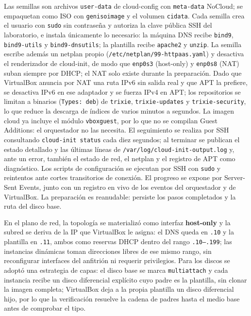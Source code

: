 Las semillas son archivos \texttt{user-data} de cloud-config con \texttt{meta-data} NoCloud; se empaquetan como ISO con \texttt{genisoimage} y el volumen \texttt{cidata}. Cada semilla crea el usuario con \texttt{sudo} sin contraseña y autoriza la clave pública SSH del laboratorio, e instala únicamente lo necesario: la máquina DNS recibe \texttt{bind9}, \texttt{bind9-utils} y \texttt{bind9-dnsutils}; la plantilla recibe \texttt{apache2} y \texttt{unzip}. La semilla escribe además un netplan propio (\texttt{/etc/netplan/99-httpaas.yaml}) y desactiva el renderizador de cloud-init, de modo que \texttt{enp0s3} (host-only) y \texttt{enp0s8} (NAT) suban siempre por DHCP; el NAT solo existe durante la preparación. Dado que VirtualBox anuncia por NAT una ruta IPv6 sin salida real y que APT la prefiere, se desactiva IPv6 en ese adaptador y se fuerza IPv4 en APT; los repositorios se limitan a binarios (\texttt{Types: deb}) de \texttt{trixie}, \texttt{trixie-updates} y \texttt{trixie-security}, lo que reduce la descarga de índices de varios minutos a segundos. La imagen cloud ya incluye el módulo \texttt{vboxguest}, por lo que no se compilan Guest Additions: el orquestador no las necesita. El seguimiento se realiza por SSH consultando \texttt{cloud-init status} cada diez segundos; al terminar se publican el estado detallado y las últimas líneas de \texttt{/var/log/cloud-init-output.log} y, ante un error, también el estado de red, el netplan y el registro de APT como diagnóstico. Los scripts de configuración se ejecutan por SSH con \texttt{sudo} y reintentos ante cortes transitorios de conexión. El progreso se expone por Server-Sent Events, junto con un registro en vivo de los eventos del orquestador y de VirtualBox. La preparación es reanudable: persiste los pasos completados y la ruta del disco base.

En el plano de red, la topología se materializó como interfaz \textbf{host-only} y la subred se deriva de la IP que VirtualBox le asigna: el DNS queda en \texttt{.10} y la plantilla en \texttt{.11}, ambos como reservas DHCP dentro del rango \texttt{.10--.199}; las instancias dinámicas toman direcciones libres de ese mismo rango, sin reconfigurar interfaces del anfitrión ni requerir privilegios. Para los discos se adoptó una estrategia de capas: el disco base se marca \texttt{multiattach} y cada instancia recibe un disco diferencial explícito cuyo padre es la plantilla, sin clonar la imagen completa; VirtualBox deja a la propia plantilla un disco diferencial hijo, por lo que la verificación resuelve la cadena de padres hasta el medio base antes de comprobar el tipo.

